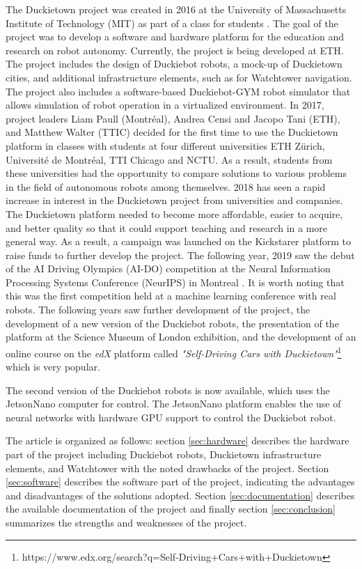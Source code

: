 \documentclass[conference]{IEEEtran}
\begin{document}
The Duckietown project was created in 2016 at the University of Massachusetts Institute of Technology (MIT) as part of a class for students \cite{paull2017duckietown}. The goal of the project was to develop a software and hardware platform for the education and research on robot autonomy. Currently, the project is being developed at ETH. The project includes the design of Duckiebot robots, a mock-up of Duckietown cities, and additional infrastructure elements, such as for Watchtower navigation. The project also includes a software-based Duckiebot-GYM robot simulator that allows simulation of robot operation in a virtualized environment. 
In 2017, project leaders Liam Paull (Montréal), Andrea Censi and Jacopo Tani (ETH), and Matthew Walter (TTIC) decided for the first time to use the Duckietown platform in classes with students at four different universities ETH Zürich, Université de Montréal, TTI Chicago and NCTU. As a result, students from these universities had the opportunity to compare solutions to various problems in the field of autonomous robots among themselves. 2018 has seen a rapid increase in interest in the Duckietown project from universities and companies. The Duckietown platform needed to become more affordable, easier to acquire, and better quality so that it could support teaching and research in a more general way. As a result, a campaign was launched on the Kickstarer platform to raise funds to further develop the project. The following year, 2019 saw the debut of the AI Driving Olympics (AI-DO) competition at the Neural Information Processing Systems Conference (NeurIPS) in Montreal \cite{censi2019ai}. It is worth noting that this was the first competition held at a machine learning conference with real robots. The following years saw further development of the project, the development of a new version of the Duckiebot robots, the presentation of the platform at the Science Museum of London exhibition, and the development of an online course on the \emph{edX} platform called \emph{"Self-Driving Cars with Duckietown"}\footnote{https://www.edx.org/search?q=Self-Driving+Cars+with+Duckietown} which is very popular.

The second version of the Duckiebot robots is now available, which uses the JetsonNano computer for control. The JetsonNano platform enables the use of neural networks with hardware GPU support to control the Duckiebot robot. 

The article is organized as follows: section \ref{sec:hardware} describes the hardware part of the project including Duckiebot robots, Duckietown infrastructure elements, and Watchtower with the noted drawbacks of the project. Section \ref{sec:software} describes the software part of the project, indicating the advantages and disadvantages of the solutions adopted.
Section \ref{sec:documentation} describes the available documentation of the project and finally section \ref{sec:conclusion} summarizes the strengths and weaknesses of the project.
\end{document}
